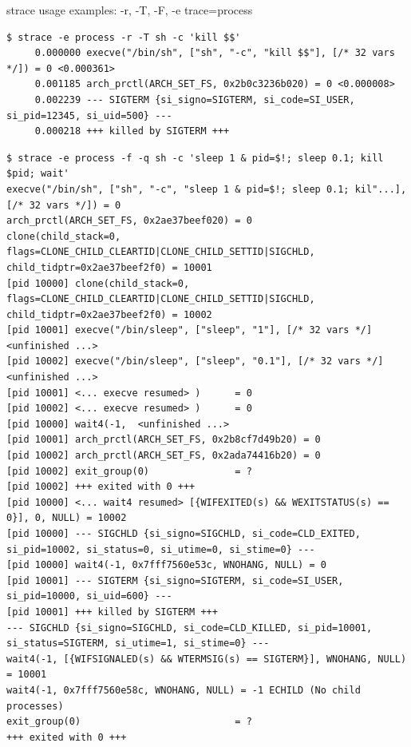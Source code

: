 \documentclass[unicode]{beamer}
\begin{document}
\begin{frame}[fragile]{strace usage examples: -r, -T, -F, -e trace=process}
\Tiny
\begin{verbatim}
$ strace -e process -r -T sh -c 'kill $$'
     0.000000 execve("/bin/sh", ["sh", "-c", "kill $$"], [/* 32 vars */]) = 0 <0.000361>
     0.001185 arch_prctl(ARCH_SET_FS, 0x2b0c3236b020) = 0 <0.000008>
     0.002239 --- SIGTERM {si_signo=SIGTERM, si_code=SI_USER, si_pid=12345, si_uid=500} ---
     0.000218 +++ killed by SIGTERM +++
\end{verbatim}

\begin{verbatim}
$ strace -e process -f -q sh -c 'sleep 1 & pid=$!; sleep 0.1; kill $pid; wait'
execve("/bin/sh", ["sh", "-c", "sleep 1 & pid=$!; sleep 0.1; kil"...], [/* 32 vars */]) = 0
arch_prctl(ARCH_SET_FS, 0x2ae37beef020) = 0
clone(child_stack=0, flags=CLONE_CHILD_CLEARTID|CLONE_CHILD_SETTID|SIGCHLD, child_tidptr=0x2ae37beef2f0) = 10001
[pid 10000] clone(child_stack=0, flags=CLONE_CHILD_CLEARTID|CLONE_CHILD_SETTID|SIGCHLD, child_tidptr=0x2ae37beef2f0) = 10002
[pid 10001] execve("/bin/sleep", ["sleep", "1"], [/* 32 vars */] <unfinished ...>
[pid 10002] execve("/bin/sleep", ["sleep", "0.1"], [/* 32 vars */] <unfinished ...>
[pid 10001] <... execve resumed> )      = 0
[pid 10002] <... execve resumed> )      = 0
[pid 10000] wait4(-1,  <unfinished ...>
[pid 10001] arch_prctl(ARCH_SET_FS, 0x2b8cf7d49b20) = 0
[pid 10002] arch_prctl(ARCH_SET_FS, 0x2ada74416b20) = 0
[pid 10002] exit_group(0)               = ?
[pid 10002] +++ exited with 0 +++
[pid 10000] <... wait4 resumed> [{WIFEXITED(s) && WEXITSTATUS(s) == 0}], 0, NULL) = 10002
[pid 10000] --- SIGCHLD {si_signo=SIGCHLD, si_code=CLD_EXITED, si_pid=10002, si_status=0, si_utime=0, si_stime=0} ---
[pid 10000] wait4(-1, 0x7fff7560e53c, WNOHANG, NULL) = 0
[pid 10001] --- SIGTERM {si_signo=SIGTERM, si_code=SI_USER, si_pid=10000, si_uid=600} ---
[pid 10001] +++ killed by SIGTERM +++
--- SIGCHLD {si_signo=SIGCHLD, si_code=CLD_KILLED, si_pid=10001, si_status=SIGTERM, si_utime=1, si_stime=0} ---
wait4(-1, [{WIFSIGNALED(s) && WTERMSIG(s) == SIGTERM}], WNOHANG, NULL) = 10001
wait4(-1, 0x7fff7560e58c, WNOHANG, NULL) = -1 ECHILD (No child processes)
exit_group(0)                           = ?
+++ exited with 0 +++
\end{verbatim}
\end{frame}
\end{document}

